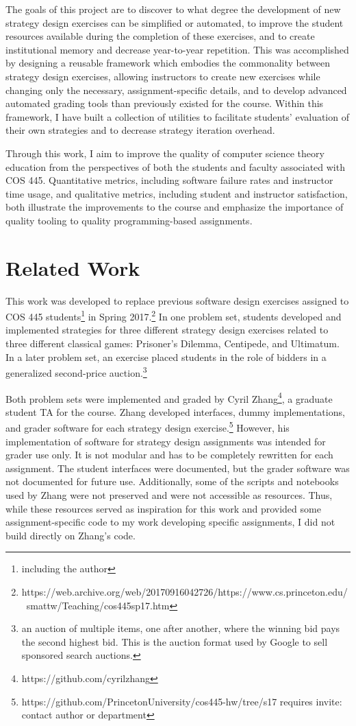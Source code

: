 \documentclass[pageno]{jpaper}
\begin{document}
The goals of this project are to discover to what degree the development of new strategy design exercises can be simplified or automated, to improve the student resources available during the completion of these exercises, and to create institutional memory and decrease year-to-year repetition.
This was accomplished by designing a reusable framework which embodies the commonality between strategy design exercises, allowing instructors to create new exercises while changing only the necessary, assignment-specific details, and to develop advanced automated grading tools than previously existed for the course.
Within this framework, I have built a collection of utilities to facilitate students' evaluation of their own strategies and to decrease strategy iteration overhead.

Through this work, I aim to improve the quality of computer science theory education from the perspectives of both the students and faculty associated with COS 445.
Quantitative metrics, including software failure rates and instructor time usage, and qualitative metrics, including student and instructor satisfaction, both illustrate the improvements to the course and emphasize the importance of quality tooling to quality programming-based assignments.

\section*{Related Work}
This work was developed to replace previous software design exercises assigned to COS 445 students\footnote{including the author} in Spring 2017.\footnote{https://web.archive.org/web/20170916042726/https://www.cs.princeton.edu/~smattw/Teaching/cos445sp17.htm}
In one problem set, students developed and implemented strategies for three different strategy design exercises related to three different classical games: Prisoner's Dilemma, Centipede, and Ultimatum.
In a later problem set, an exercise placed students in the role of bidders in a generalized second-price auction.\footnote{an auction of multiple items, one after another, where the winning bid pays the second highest bid. This is the auction format used by Google to sell sponsored search auctions.}

Both problem sets were implemented and graded by Cyril Zhang\footnote{https://github.com/cyrilzhang}, a graduate student TA for the course.
Zhang developed interfaces, dummy implementations, and grader software for each strategy design exercise.\footnote{https://github.com/PrincetonUniversity/cos445-hw/tree/s17 requires invite: contact author or department}
However, his implementation of software for strategy design assignments was intended for grader use only.
It is not modular and has to be completely rewritten for each assignment.
The student interfaces were documented, but the grader software was not documented for future use.
Additionally, some of the scripts and notebooks used by Zhang were not preserved and were not accessible as resources.
Thus, while these resources served as inspiration for this work and provided some assignment-specific code to my work developing specific assignments, I did not build directly on Zhang's code.
\end{document}
